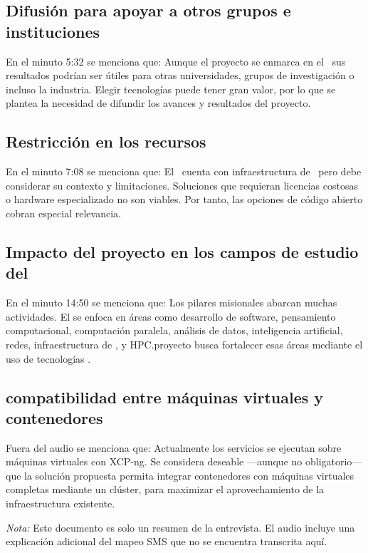 \subsection{Difusión para apoyar a otros grupos e instituciones}
\noindent
En el minuto 5:32 se menciona que: Aunque el proyecto se enmarca en el \GRID\, sus resultados podrían ser útiles para otras universidades, grupos de investigación o incluso la industria. Elegir tecnologías \VBC{} puede tener gran valor, por lo que se plantea la necesidad de difundir los avances y resultados del proyecto.

\subsection{Restricción en los recursos}
\noindent
En el minuto 7:08 se menciona que: El \GRID\ cuenta con infraestructura de \TI\, pero debe considerar su contexto y limitaciones. Soluciones que requieran licencias costosas o hardware especializado no son viables. Por tanto, las opciones de código abierto cobran especial relevancia.

\subsection{Impacto del proyecto en los campos de estudio del \GRID}
\noindent
En el minuto 14:50 se menciona que: Los pilares misionales abarcan muchas actividades. El \GRID se enfoca en áreas como desarrollo de software, pensamiento computacional, computación paralela, análisis de datos, inteligencia artificial, redes, infraestructura de \TI, y HPC.\@Este proyecto busca fortalecer esas áreas mediante el uso de tecnologías \VBC.\@

\subsection{compatibilidad entre máquinas virtuales y contenedores}
\noindent
Fuera del audio se menciona que: Actualmente los servicios se ejecutan sobre máquinas virtuales con XCP-ng. Se considera deseable —aunque no obligatorio— que la solución propuesta permita integrar contenedores con máquinas virtuales completas mediante un clúster, para maximizar el aprovechamiento de la infraestructura existente.

\bigskip\noindent \textit{Nota:} Este documento es solo un resumen de la entrevista. El audio incluye una explicación adicional del mapeo SMS que no se encuentra transcrita aquí.